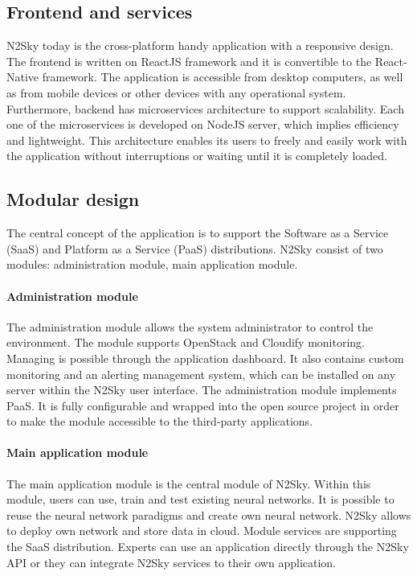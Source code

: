 \documentclass[conference]{IEEEtran}
\begin{document}
\subsection{Frontend and services}

N2Sky today is the cross-platform handy application with a responsive design. The frontend is written on ReactJS framework and it is convertible to the React-Native framework. The application is accessible from desktop computers, as well as from mobile devices or  other devices with any operational system. Furthermore, backend has microservices architecture to support scalability. Each one of the microservices is developed on NodeJS server, which implies efficiency and lightweight. This architecture enables its users to freely and easily work with the application without interruptions or waiting until it is completely loaded. 


\subsection{Modular design}

The central concept of the application is to support the Software as a Service (SaaS) and Platform as a Service (PaaS) distributions.  N2Sky consist of two modules: administration module, main application module.

\paragraph{Administration module} The administration module allows the system administrator to control the environment. The module supports OpenStack and Cloudify monitoring. Managing is possible through the application dashboard. It also contains custom monitoring and an alerting management system, which can be installed on any server within the N2Sky user interface. The administration module implements PaaS. It is fully configurable and wrapped into the open source project in order to make the module accessible to the third-party applications. 
\paragraph{Main application module} The main application module is the central module of N2Sky. Within this module, users can use, train and test existing neural networks. It is possible to reuse the neural network paradigms and create own neural network. N2Sky allows to deploy own network and store data in cloud. Module services are supporting the SaaS distribution. Experts can use an application directly through the N2Sky API or they can integrate N2Sky services to their own application. 
\end{document}
